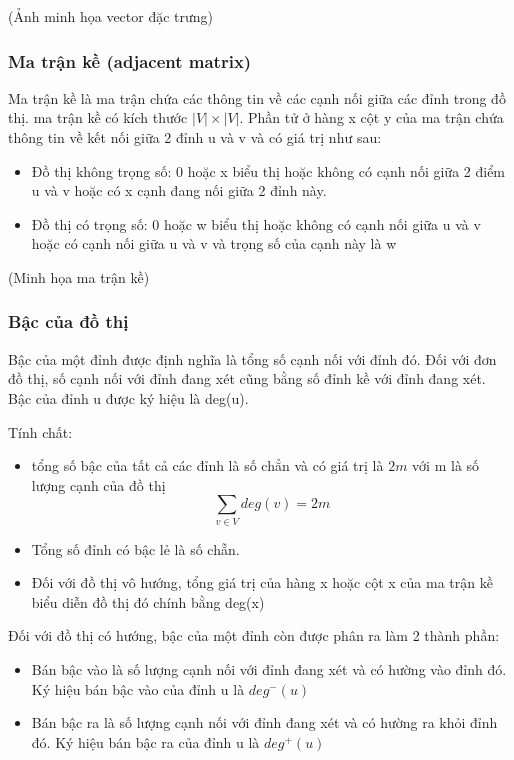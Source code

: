 (Ảnh minh họa vector đặc trưng)

\subsubsection{Ma trận kề (adjacent matrix)}

Ma trận kề là ma trận chứa các thông tin về các cạnh nối giữa các đỉnh trong đồ thị. ma trận kề có kích thước $|V| \times |V|$. Phần tử ở hàng x cột y của ma trận chứa thông tin về kết nối giữa 2 đỉnh u và v và có giá trị như sau:
\begin{itemize}
	\item Đồ thị không trọng số: 0 hoặc x biểu thị hoặc không có cạnh nối giữa 2 điểm u và v hoặc có x cạnh đang nối giữa 2 đỉnh này.
	\item Đồ thị có trọng số: 0 hoặc w biểu thị hoặc không có cạnh nối giữa u và v hoặc có cạnh nối giữa u và v và trọng số của cạnh này là w
\end{itemize}

(Minh họa ma trận kề)

\subsubsection{Bậc của đồ thị}

Bậc của một đỉnh được định nghĩa là tổng số cạnh nối với đỉnh đó. Đối với đơn đồ thị, số cạnh nối với đỉnh đang xét cũng bằng số đỉnh kề với đỉnh đang xét. Bậc của đỉnh u được ký hiệu là deg(u).

Tính chất:
\begin{itemize}
	\item tổng số bậc của tất cả các đỉnh là số chẳn và có giá trị là $2m$ với m là số lượng cạnh của đồ thị
	\begin{equation*}
		\sum_{v \in V}{deg(v)} = 2m
	\end{equation*}
	\item Tổng số đỉnh có bậc lẻ là số chẵn.
	\item Đối với đồ thị vô hướng, tổng giá trị của hàng x hoặc cột x của ma trận kề biểu diễn đồ thị đó chính bằng deg(x)
\end{itemize}

Đối với đồ thị có hướng, bậc của một đỉnh còn được phân ra làm 2 thành phần:
\begin{itemize}
	\item Bán bậc vào là số lượng cạnh nối với đỉnh đang xét và có hường vào đỉnh đó. Ký hiệu bán bậc vào của đỉnh u là $deg^-(u)$
	\item Bán bậc ra là số lượng cạnh nối với đỉnh đang xét và có hường ra khỏi đỉnh đó. Ký hiệu bán bậc ra của đỉnh u là $deg^+(u)$
\end{itemize}

